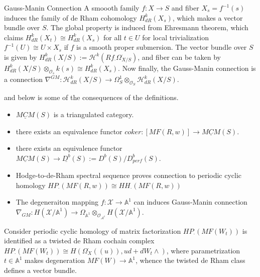 \documentclass{article}
\begin{document}
\begin{definition}{Gauss-Manin Connection}{}
A smoooth family $f:X\to S$ and fiber $X_s = f^{-1}(s)$ induces the family of de Rham cohomology $H_{dR}^k (X_s)$,
which makes a vector bundle over $S$. 
The global property is induced from Ehresmann theorem, which claims $H_{dR}^k (X_t) \cong H_{dR}^k (X_s)$ for all $t\in U$
for local trivialization $f^{-1}(U)\cong U\times X_s$ if $f$ is a smooth proper submersion. 
The vector bundle over $S$ is given by $H_{dR}^k (X/S) := \mathcal{H}^k (Rf_\cdot \Omega_{X/S}^\cdot)$,
and fiber can be taken by $H_{dR}^k (X/S) \otimes_{\mathcal{O}_s} k(s) \cong H_{dR}^k (X_s)$.
Now finally, the Gauss-Manin connection is a connection 
$\nabla^{GM} : \mathcal{H}_{dR}^k (X/S) \to \Omega_S^1 \otimes_{\mathcal{O}_S} \mathcal{H}_{dR}^k (X/S)$.
\end{definition}




\noindent
and below is some of the consequences of the definitions. \\

\begin{proposition} {}{}
\begin{itemize}
\item $\underline{MCM}(S)$ is a triangulated category.
\item there exists an equivalence functor $coker: [MF(R,w)] \to \underline{MCM}(S)$.
\item there exists an equivalence functor $\underline{MCM}(S) \to \underline{D^b}(S) := D^b(S)/D^b_{perf}(S)$.
\item Hodge-to-de-Rham spectral sequence proves connection to periodic cyclic homology
$HP_\cdot (MF(R,w)) \cong HH_\cdot (MF(R,w))$
\item The degeneraiton mapping $f: \mathcal{X} \to \mathbb{A}^1$ can induces Gauss-Manin connection
$\nabla_{GM}: H(\mathcal{X}/\mathbb{A}^1)\to \Omega_{\mathbb{A}^1} \otimes_{\mathcal{O}_{\mathcal{A}^1}} H(\mathcal{X}/\mathbb{A}^1)$.
\end{itemize}
\end{proposition}


\begin{example}{}{}
Consider periodic cyclic homology of matrix factorization $HP_\cdot (MF(W_t))$ is identified as a twisted de Rham cochain complex
$HP_\cdot (MF(W_t)) \cong H(\Omega_X^\cdot ((u)), ud + dW_t \wedge)$, 
where parametrization $t\in \mathbb{A}^1$ makes degeneration $MF(W)\to \mathbb{A}^1$, 
whence the twisted de Rham class defines a vector bundle.
\end{example}
\end{document}
